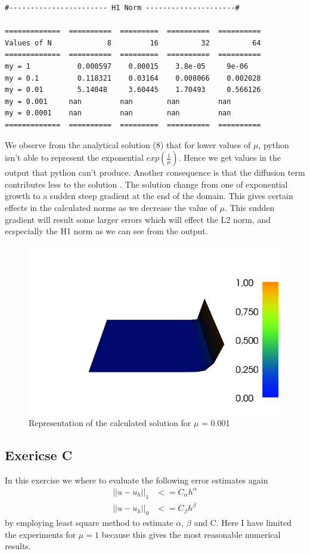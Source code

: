 \documentclass[a4paper,norsk]{article}
\begin{document}
\begin{lstlisting}[style=terminal]
#----------------------- H1 Norm ---------------------#

=============  ==========  =========  ==========  ==========
Values of N             8         16          32          64
=============  ==========  =========  ==========  ==========
my = 1           0.000597    0.00015    3.8e-05     9e-06
my = 0.1         0.118321    0.03164    0.008066    0.002028
my = 0.01        5.14048     3.60445    1.70493     0.566126
my = 0.001     nan         nan        nan         nan
my = 0.0001    nan         nan        nan         nan
=============  ==========  =========  ==========  ==========

\end{lstlisting}
\newpage
We observe from the analytical solution (8)
that for lower values of $\mu$, python isn't able to represent the exponential
$exp(\frac{1}{\mu})$. Hence we get values in the output that
python can't produce. \newline
Another consequence is that the diffusion term contributes less to the solution
. The solution change from one of exponential growth to a sudden steep gradient
at the end of the domain. This gives certain effects in the calculated norms as we
decrease the value of $\mu$. This sudden gradient will result some larger errors
which will effect the L2 norm, and ecspecially the H1 norm as we can see from the
output.

\begin{figure}
	\centering
	\caption*{Representation of the calculated solution for $\mu$ = 0.001}
	\includegraphics[scale=0.6]{dolfin_plot_2.png}
\end{figure}

\subsection*{Exericse C}
In this exercise we where to evaluate the following error estimates again
\begin{align*}
||u - u_h||_1 &<= C_{\alpha}h^{\alpha} \\
||u - u_h||_0 &<= C_{\beta}h^{\beta}
\end{align*}
by employing least square method to estimate $\alpha$, $\beta$ and C. Here I have limited the experiments
for $\mu = 1$ because this gives the most reasonable numerical results. \\
\end{document}
